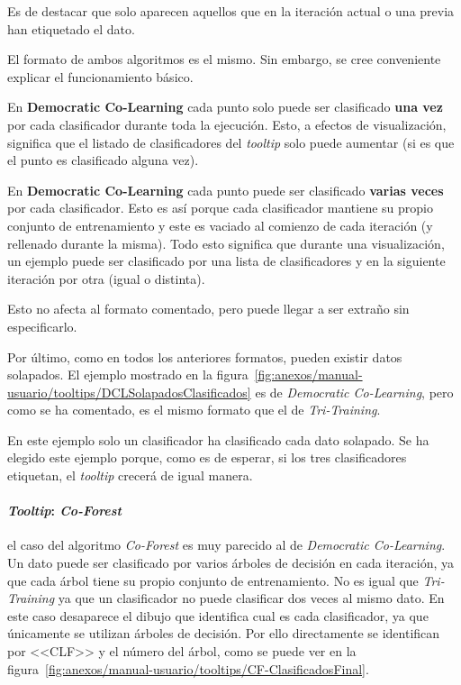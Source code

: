 Es de destacar que solo aparecen aquellos que en la iteración actual o una
previa han etiquetado el dato.

El formato de ambos algoritmos es el mismo. Sin embargo, se cree conveniente
explicar el funcionamiento básico.

En \textbf{Democratic Co-Learning} cada punto solo puede ser clasificado
\textbf{una vez} por cada clasificador durante toda la ejecución. Esto, a
efectos de visualización, significa que el listado de clasificadores del
\textit{tooltip} solo puede aumentar (si es que el punto es clasificado alguna
vez).

En \textbf{Democratic Co-Learning} cada punto puede ser clasificado
\textbf{varias veces} por cada clasificador. Esto es así porque cada
clasificador mantiene su propio conjunto de entrenamiento y este es vaciado al
comienzo de cada iteración (y rellenado durante la misma). Todo esto significa
que durante una visualización, un ejemplo puede ser clasificado por una lista de
clasificadores y en la siguiente iteración por otra (igual o distinta).

Esto no afecta al formato comentado, pero puede llegar a ser extraño sin
especificarlo.

Por último, como en todos los anteriores formatos, pueden existir datos
solapados. El ejemplo mostrado en la
figura~\ref{fig:anexos/manual-usuario/tooltips/DCLSolapadosClasificados} es de
\textit{Democratic Co-Learning}, pero como se ha comentado, es el mismo formato
que el de \textit{Tri-Training}.


En este ejemplo solo un clasificador ha clasificado cada dato solapado. Se ha
elegido este ejemplo porque, como es de esperar, si los tres clasificadores
etiquetan, el \textit{tooltip} crecerá de igual manera.

\paragraph{\textit{Tooltip}: \textit{Co-Forest}} el caso del algoritmo \textit{Co-Forest} es muy parecido al de \textit{Democratic Co-Learning}. Un dato puede ser clasificado por varios árboles de decisión en cada iteración, ya que cada árbol tiene su propio conjunto de entrenamiento. No es igual que \textit{Tri-Training} ya que un clasificador no puede clasificar dos veces al mismo dato. En este caso desaparece el dibujo que identifica cual es cada clasificador, ya que únicamente se utilizan árboles de decisión. Por ello directamente se identifican por <<CLF>> y el número del árbol, como se puede ver en la figura~\ref{fig:anexos/manual-usuario/tooltips/CF-ClasificadosFinal}.
	
